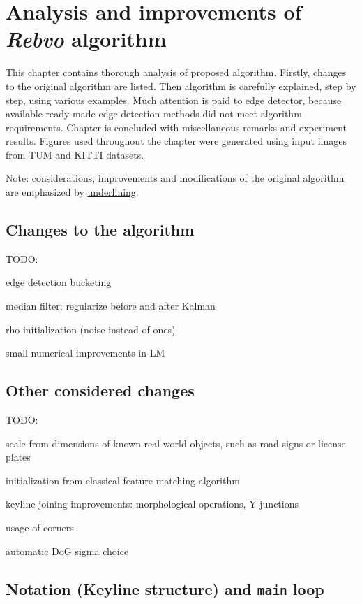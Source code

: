 \chapter{Analysis and improvements of \textit{Rebvo} algorithm}
\label{cha:intro2}

This chapter contains thorough analysis of proposed algorithm. Firstly, changes to the original algorithm are listed. Then algorithm is carefully explained, step by step, using various examples. Much attention is paid to edge detector, because available ready-made edge detection methods did not meet algorithm requirements. Chapter is concluded with miscellaneous remarks and experiment results. Figures used throughout the chapter were generated using input images from TUM \cite{tum} and KITTI \cite{kitti} datasets.

Note: considerations, improvements and modifications of the original algorithm are emphasized by \underline{underlining}.

\section{Changes to the algorithm}
\label{sec:changes}

TODO:

edge detection bucketing

median filter; regularize before and after Kalman

rho initialization (noise instead of ones)

small numerical improvements in LM


\section{Other considered changes}
\label{sec:rejected}

TODO:

scale from dimensions of known real-world objects, such as road signs or license plates

initialization from classical feature matching algorithm

keyline joining improvements: morphological operations, Y junctions

usage of corners

automatic DoG sigma choice


\section{Notation (Keyline structure) and {\tt main} loop}
\label{sec:struct}

